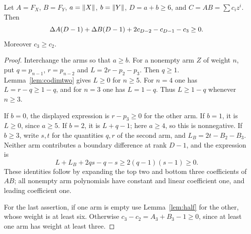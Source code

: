 \begin{lemma}\label{lem:centralproduct}
Let $A=F_X$, $B=F_Y$, $a=\lVert X\rVert$, $b=\lVert Y\rVert$, $D=a+b\ge6$, and
$C=AB=\sum c_i z^i$. Then
\[
 \Delta A(D-1)+\Delta B(D-1)+2c_{D-2}-c_{D-1}-c_3\ge0.
\]
Moreover $c_3\ge c_2$.
\end{lemma}
\begin{proof}
Interchange the arms so that $a\ge b$.
For a nonempty arm $Z$ of weight $n$, put
$q=p_{n-1}$, $r=p_{n-2}$ and $L=2r-p_2-p_3$.
Then $q\ge1$. Lemma~\ref{lem:codimtwo} gives $L\ge0$ for $n\ge5$.
For $n=4$ one has $L=r-q\ge1-q$, and for $n=3$ one has
$L=1-q$. Thus $L\ge1-q$ whenever $n\ge3$.

If $b=0$, the displayed expression is $r-p_3\ge0$ for the other arm.
If $b=1$, it is $L\ge0$, since $a\ge5$. If $b=2$, it is $L+q-1$;
here $a\ge4$, so this is nonnegative. If $b\ge3$, write $s,t$ for
the quantities $q,r$ of the second arm, and $L_B=2t-B_2-B_3$.
Neither arm contributes a boundary difference at rank $D-1$, and the
expression is
\[
 L+L_B+2qs-q-s
 \ge 2(q-1)(s-1)\ge0.
\]
These identities follow by expanding the top two and bottom three
coefficients of $AB$; all nonempty arm polynomials have constant and
linear coefficient one, and leading coefficient one.

For the last assertion, if one arm is empty use
Lemma~\ref{lem:half} for the other, whose weight is at least six.
Otherwise $c_3-c_2=A_3+B_3-1\ge0$, since at least one arm has
weight at least three.
\end{proof}


